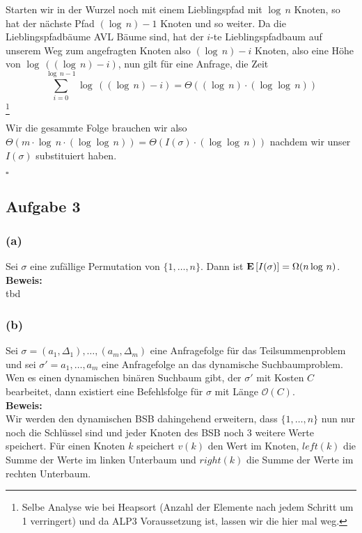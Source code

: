 \documentclass[11pt,a4paper,ngerman]{article}
\newcommand{\erw}[1]{\text{\bfseries E} \left[ #1 \right]}
\begin{document}
Starten wir in der Wurzel noch mit einem Lieblingspfad mit $\log \, n$ Knoten, so hat der nächste Pfad $(\log \, n)-1$ Knoten und so weiter. Da die Lieblingspfadbäume AVL Bäume sind, hat der $i$-te Lieblingspfadbaum auf unserem Weg zum angefragten Knoten also $(\log \, n) - i$ Knoten,
also eine Höhe von $\log \, ((\log \, n) - i)$, nun gilt für eine Anfrage, die Zeit
$$
	\sum_{i=0}^{\log \, n - 1} \log \, ((\log \, n) - i) = \Theta((\log \,n) \cdot (\log \log \, n))
$$\footnote{Selbe Analyse wie bei Heapsort (Anzahl der Elemente nach jedem Schritt um 1 verringert) und da ALP3 Voraussetzung ist, lassen wir die hier mal weg.}

Wir die gesammte Folge brauchen wir also $\Theta(m \cdot \log \, n \cdot (\log \log \, n))= \Theta(I(\sigma) \cdot (\log \log \, n))$ nachdem wir
unser $I(\sigma)$  substituiert haben.

\mbox{}\hfill$\square$

\subsection*{Aufgabe 3}

\subsubsection*{(a)} Sei $\sigma$ eine zufällige Permutation von $\{ 1 , \ldots , n \}$. Dann ist $\erw{I(\sigma)} = \Omega(n \log \, n)$.\\

\noindent\textbf{Beweis:}\\

tbd

\subsubsection*{(b)} Sei $\sigma = (a_1, \Delta_1), \ldots, (a_m, \Delta_m)$ eine Anfragefolge für das Teilsummenproblem und sei $\sigma' = a_1, \ldots, a_m$ eine Anfragefolge an das dynamische Suchbaumproblem. Wen es einen dynamischen binären Suchbaum gibt, der $\sigma'$ mit Kosten $C$ bearbeitet, dann existiert eine Befehlsfolge für $\sigma$ mit Länge $\mathcal{O}(C)$.\\

\noindent\textbf{Beweis:}\\

Wir werden den dynamischen BSB dahingehend erweitern, dass $\{1, \ldots, n\}$ nun nur noch die Schlüssel sind und jeder Knoten des BSB
noch 3 weitere Werte speichert. Für einen Knoten $k$ speichert $v(k)$ den Wert im Knoten, $left(k)$ die Summe der Werte im linken Unterbaum
und $right(k)$ die Summe der Werte im rechten Unterbaum.\\
\end{document}
